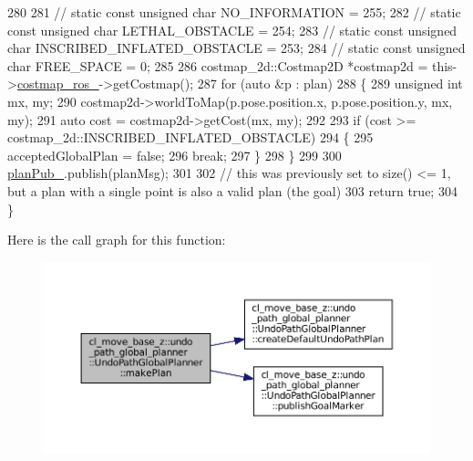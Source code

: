 \begin{DoxyCode}
280 
281             \textcolor{comment}{// static const unsigned char NO\_INFORMATION = 255;}
282             \textcolor{comment}{// static const unsigned char LETHAL\_OBSTACLE = 254;}
283             \textcolor{comment}{// static const unsigned char INSCRIBED\_INFLATED\_OBSTACLE = 253;}
284             \textcolor{comment}{// static const unsigned char FREE\_SPACE = 0;}
285 
286             costmap\_2d::Costmap2D *costmap2d = this->\hyperlink{classcl__move__base__z_1_1undo__path__global__planner_1_1UndoPathGlobalPlanner_ab63eeb465e3ae989a6edcc4d059cf8f0}{costmap\_ros\_}->getCostmap();
287             \textcolor{keywordflow}{for} (\textcolor{keyword}{auto} &p : plan)
288             \{
289                 \textcolor{keywordtype}{unsigned} \textcolor{keywordtype}{int} mx, my;
290                 costmap2d->worldToMap(p.pose.position.x, p.pose.position.y, mx, my);
291                 \textcolor{keyword}{auto} cost = costmap2d->getCost(mx, my);
292 
293                 \textcolor{keywordflow}{if} (cost >= costmap\_2d::INSCRIBED\_INFLATED\_OBSTACLE)
294                 \{
295                     acceptedGlobalPlan = \textcolor{keyword}{false};
296                     \textcolor{keywordflow}{break};
297                 \}
298             \}
299 
300             \hyperlink{classcl__move__base__z_1_1undo__path__global__planner_1_1UndoPathGlobalPlanner_a65bf364a122d5950baf1bf8b42309d68}{planPub\_}.publish(planMsg);
301 
302             \textcolor{comment}{// this was previously set to size() <= 1, but a plan with a single point is also a valid plan
       (the goal)}
303             \textcolor{keywordflow}{return} \textcolor{keyword}{true};
304         \}
\end{DoxyCode}
Here is the call graph for this function\+:
\nopagebreak
\begin{figure}[H]
\begin{center}
\leavevmode
\includegraphics[width=350pt]{classcl__move__base__z_1_1undo__path__global__planner_1_1UndoPathGlobalPlanner_a46034d27c0811abae440009457a7f8b0_cgraph}
\end{center}
\end{figure}
